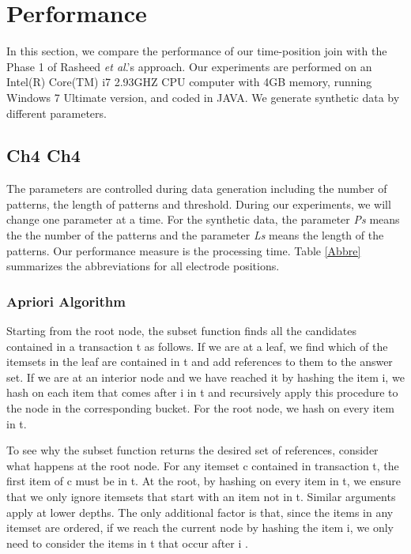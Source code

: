 %
%
%
\chapter{Performance}
\vspace*{30pt} In this section, we compare the performance of our
time-position join with the Phase 1 of Rasheed \emph{et al}.'s
approach. Our experiments are performed on an Intel(R) Core(TM) i7
2.93GHZ CPU computer with 4GB memory, running Windows 7 Ultimate
version, and coded in JAVA. We generate synthetic data by different
parameters.

\section{Ch4 Ch4}
The parameters are controlled during data generation including the
number of patterns, the length of patterns and threshold. During our
experiments, we will change one parameter at a time. For the
synthetic data, the parameter \emph{Ps} means the the number of the
patterns and the parameter \emph{Ls} means the length of the
patterns. Our performance measure is the processing time. Table
\ref{Abbre} summarizes the abbreviations for all electrode
positions.

\subsection{Apriori Algorithm} 
Starting from the root node, the subset function
finds all the candidates contained in a transaction
t as follows. If we are at a leaf, we find which of
the itemsets in the leaf are contained in t and add
references to them to the answer set. If we are at an
interior node and we have reached it by hashing the
item i, we hash on each item that comes after i in t
and recursively apply this procedure to the node in
the corresponding bucket. For the root node, we hash
on every item in t.
\par
To see why the subset function returns the desired
set of references, consider what happens at the root
node. For any itemset c contained in transaction t, the first item of c must be in t. At the root, by hashing on every item in t, we ensure that we only ignore itemsets that start with an item not in t. Similar arguments apply at lower depths. The only additional factor is that, since the items in any itemset are ordered, if we reach the current node by hashing the item i, we only need to consider the items in t that occur after i \cite{Agrawal1994algorithms}.

